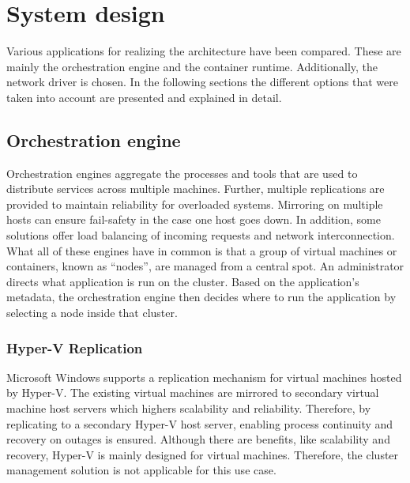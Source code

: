 \chapter{System design} %

\label{chap:design} %

Various applications for realizing the architecture have been compared. These are mainly the orchestration engine and the container runtime. Additionally, the network driver is chosen. In the following sections the different options that were taken into account are presented and explained in detail.

\section{Orchestration engine}
Orchestration engines aggregate the processes and tools that are used to distribute services across multiple machines. Further, multiple replications are provided to maintain reliability for overloaded systems. Mirroring on multiple hosts can ensure fail-safety in the case one host goes down. In addition, some solutions offer load balancing of incoming requests and network interconnection.
What all of these engines have in common is that a group of virtual machines or containers, known as \enquote{nodes}, are managed from a central spot. An administrator directs what application is run on the cluster. Based on the application's metadata, the orchestration engine then decides where to run the application by selecting a node inside that cluster.

\subsection{Hyper-V Replication} Microsoft \ac{Windows} supports a replication mechanism for virtual machines hosted by Hyper-V. The existing virtual machines are mirrored to secondary virtual machine host servers which highers scalability and reliability. Therefore, by replicating to a secondary Hyper-V host server, enabling process continuity and recovery on outages is ensured.
Although there are benefits, like scalability and recovery, Hyper-V is mainly designed for virtual machines. Therefore, the cluster management solution is not applicable for this use case.

